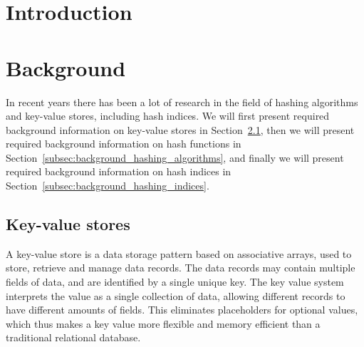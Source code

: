 \documentclass[11pt]{article} %
\begin{document}
\maketitle %

\begin{abstract}
\end{abstract}
\tableofcontents %
\listoffigures  %
\listoftables   %

\newpage
\section{Introduction}

\newpage
\section{Background}
\label{sec:background}
In recent years there has been a lot of research in the field of hashing algorithms and key-value stores, including hash indices. We will first present required background information on key-value stores in Section~\ref{subsec:background_key_value_store}, then we will present required background information on hash functions in Section~\ref{subsec:background_hashing_algorithms}, and finally we will present required background information on hash indices in Section~\ref{subsec:background_hashing_indices}.
\subsection{Key-value stores}
\label{subsec:background_key_value_store}
A key-value store is a data storage pattern based on associative arrays, used to store, retrieve and manage data records. The data records may contain multiple fields of data, and are identified by a single unique key. The key value system interprets the value as a single collection of data, allowing different records to have different amounts of fields. This eliminates placeholders for optional values, which thus makes a key value more flexible and memory efficient than a traditional relational database.\\
\end{document}
